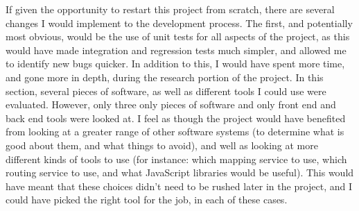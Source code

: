 If given the opportunity to restart this project from scratch, there are several changes I would implement to the development process. The first, and potentially most obvious, would be the use of unit tests for all aspects of the project, as this would have made integration and regression tests much simpler, and allowed me to identify new bugs quicker. In addition to this, I would have spent more time, and gone more in depth, during the research portion of the project. In this section, several pieces of software, as well as different tools I could use were evaluated. However, only three only pieces of software and only front end and back end tools were looked at. I feel as though the project would have benefited from looking at a greater range of other software systems (to determine what is good about them, and what things to avoid), and well as looking at more different kinds of tools to use (for instance: which mapping service to use, which routing service to use, and what JavaScript libraries would be useful). This would have meant that these choices didn't need to be rushed later in the project, and I could have picked the right tool for the job, in each of these cases.